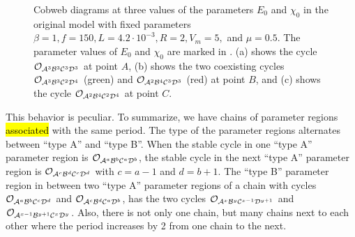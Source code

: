 \begin{figure}
	\centering
	\caption[Cobweb diagrams of the original model]{
		Cobweb diagrams at three values of the parameters $E_0$ and $\chi_0$ in the original model with fixed parameters $\beta = 1, f = 150, L = 4.2 \cdot 10^{-3}, R = 2, V_m = 5,$ and $\mu = 0.5$.
		The parameter values of $E_0$ and $\chi_0$ are marked in .
		(a) shows the cycle $\mathcal{O}_{\mathcal{A}^3\mathcal{B}^3\mathcal{C}^3\mathcal{D}^3}$ at point $A$,
		(b) shows the two coexisting cycles $\mathcal{O}_{\mathcal{A}^3\mathcal{B}^3\mathcal{C}^2\mathcal{D}^4}$ (green) and $\mathcal{O}_{\mathcal{A}^2\mathcal{B}^4\mathcal{C}^3\mathcal{D}^3}$ (red) at point $B$,
		and (c) shows the cycle $\mathcal{O}_{\mathcal{A}^2\mathcal{B}^4\mathcal{C}^2\mathcal{D}^4}$ at point $C$.
	}
	\label{fig:state.og.dynamics.cobwebs}
\end{figure}

This behavior is peculiar.
To summarize, we have chains of parameter regions \hl{associated} with the same period.
The type of the parameter regions alternates between ``type A'' and ``type B''.
When the stable cycle in one ``type A'' parameter region is $\mathcal{O}_{\mathcal{A}^a\mathcal{B}^b\mathcal{C}^a\mathcal{D}^b}$, the stable cycle in the next ``type A'' parameter region is $\mathcal{O}_{\mathcal{A}^{c}\mathcal{B}^{d}\mathcal{C}^{c}\mathcal{D}^{d}}$ with $c = a - 1$ and $d = b + 1$.
The ``type B'' parameter region in between two ``type A'' parameter regions of a chain with cycles $\mathcal{O}_{\mathcal{A}^a\mathcal{B}^b\mathcal{C}^c\mathcal{D}^d}$ and $\mathcal{O}_{\mathcal{A}^{c}\mathcal{B}^{d}\mathcal{C}^{a}\mathcal{D}^{b}}$, has the two cycles $\mathcal{O}_{\mathcal{A}^x\mathcal{B}^y\mathcal{C}^{x-1}\mathcal{D}^{y+1}}$ and $\mathcal{O}_{\mathcal{A}^{x-1}\mathcal{B}^{y+1}\mathcal{C}^x\mathcal{D}^y}$.
Also, there is not only one chain, but many chains next to each other where the period increases by 2 from one chain to the next.
